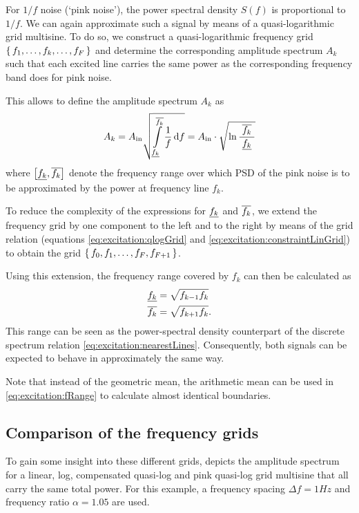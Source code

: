   For $1/f$ noise (`pink noise'), the power spectral density $S(f)$ is proportional to $1/f$.
  We can again approximate such a signal by means of a quasi-logarithmic grid multisine.
  To do so, we construct a quasi-logarithmic frequency grid $\set{f_1,\ldots,f_k,\ldots,f_F}$ and determine the corresponding amplitude spectrum $A_k$ such that each excited line carries the same power as the corresponding frequency band does for pink noise.

  This allows to define the amplitude spectrum $A_k$ as
  \begin{equation}
    A_k = A_{\mathrm{in}}
                 \sqrt{\int_{\underline{f_{k}}}
                     ^{\overline{f_{k}}}
                     \limits
                     \frac{1}
                          {f}
                     \,\mathrm{d}{f}}
          = A_{\mathrm{in}}
                \cdot
                \sqrt{
                \ln \frac{\;\overline{f_{k}}\;}{\underline{f_{k}}}
                }
  \end{equation}
  where $\left[ \underline{f_{k}}, \overline{f_{k}} \right] $ denote the frequency range over which \gls{PSD} of the pink noise is to be approximated by the power at frequency line $f_k$.

  To reduce the complexity of the expressions for $\underline{f_{k}}$ and $\overline{f_{k}}$, we extend the frequency grid by one component to the left and to the right by means of the grid relation (equations \eqref{eq:excitation:qlogGrid} and \eqref{eq:excitation:constraintLinGrid}) to obtain the grid $\set{f_0, f_1, \ldots, f_F, f_{F+1}}$.

  Using this extension, the frequency range covered by $f_k$ can then be calculated as
    \begin{align}
      \underline{f_{k}} &= \sqrt{f_{k-1} f_k}\\
      \overline{f_{k}} &= \sqrt{f_{k+1} f_k}
    \label{eq:excitation:fRange}
    \text{.}
    \end{align}
  This range can be seen as the power-spectral density counterpart of the discrete spectrum relation \eqref{eq:excitation:nearestLines}.
  Consequently, both signals can be expected to behave in approximately the same way.

  Note that instead of the geometric mean, the arithmetic mean can be used in \eqref{eq:excitation:fRange} to calculate almost identical boundaries.

  \subsection{Comparison of the frequency grids}
  To gain some insight into these different grids,  depicts the amplitude spectrum for a linear, log, compensated quasi-log and pink quasi-log grid multisine that all carry the same total power.
  For this example, a frequency spacing $\Delta f = 1\unit{Hz}$ and frequency ratio $\alpha = 1.05$ are used.
  
